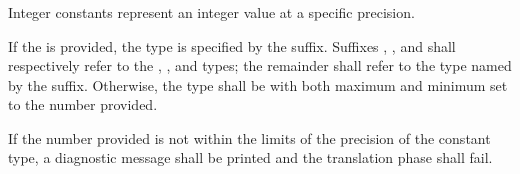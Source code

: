 \begin{grammar}
 \exactly \\
	   \\
	   \\
	   \\
	 
		 \\

 \exactly \\
	  \\

 \oneof \\
	 \\

 \exactly \\
	  \\

 \oneof \\
	 \\

 \oneof \\
	 \\
\end{grammar}

Integer constants represent an integer value at a specific precision.

\specsubitem
If the  is provided, the type is specified by the
suffix. Suffixes , ,  and  shall
respectively refer to the , , and 
types; the remainder shall refer to the type named by the suffix. Otherwise,
the type shall be  with both maximum and minimum set to the
number provided.

\specsubitem
If the number provided is not within the limits of the precision of the
constant type, a diagnostic message shall be printed and the translation phase
shall fail.

